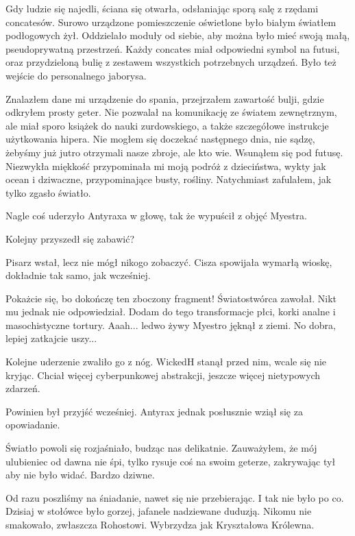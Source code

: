 Gdy ludzie się najedli, ściana się otwarła, odsłaniając sporą salę z rzędami concatesów.
Surowo urządzone pomieszczenie oświetlone było białym światłem podłogowych żył.
Oddzielało moduły od siebie, aby można było mieć swoją małą, pseudoprywatną przestrzeń.
Każdy concates miał odpowiedni symbol na futusi, oraz przydzieloną bulię z zestawem wszystkich potrzebnych urządzeń.
Było też wejście do personalnego jaborysa.

Znalazłem dane mi urządzenie do spania, przejrzałem zawartość bulji, gdzie odkryłem prosty geter.
Nie pozwalał na komunikację ze światem zewnętrznym, ale miał sporo książek do nauki zurdowskiego, a także szczegółowe instrukcje użytkowania hipera.
Nie mogłem się doczekać następnego dnia, nie sądzę, żebyśmy już jutro otrzymali nasze zbroje, ale kto wie.
Wsunąłem się pod futusę.
Niezwykła miękkość przypominała mi moją podróż z dzieciństwa, wykty jak ocean i dziwaczne, przypominające busty, rośliny.
Natychmiast zafulałem, jak tylko zgasło światło.

\divider{}

Nagle coś uderzyło Antyraxa w głowę, tak że wypuścił z objęć Myestra.

Kolejny przyszedł się zabawić?

Pisarz wstał, lecz nie mógł nikogo zobaczyć.
Cisza spowijała wymarłą wioskę, dokładnie tak samo, jak wcześniej.

\begin{dialogue}
\ds{} Pokażcie się, bo dokończę ten zboczony fragment! \dm{} Światostwórca zawołał. Nikt mu jednak nie odpowiedział. \dm{} Dodam do tego transformacje płci, korki analne i masochistyczne tortury.
\ds{} Aaah... \dm{} ledwo żywy Myestro jęknął z ziemi.
\ds{} No dobra, lepiej zatkajcie uszy...
\end{dialogue}

Kolejne uderzenie zwaliło go z nóg. 
WickedH stanął przed nim, wcale się nie kryjąc.
Chciał więcej cyberpunkowej abstrakcji, jeszcze więcej nietypowych zdarzeń.

Powinien był przyjść wcześniej.
Antyrax jednak posłusznie wziął się za opowiadanie.

\marker{}
\divider{}

Światło powoli się rozjaśniało, budząc nas delikatnie.
Zauważyłem, że mój ulubieniec od dawna nie śpi, tylko rysuje coś na swoim geterze, zakrywając tył aby nie było widać.
Bardzo dziwne.

Od razu poszliśmy na śniadanie, nawet się nie przebierając. I tak nie było po co.
Dzisiaj w stołówce było gorzej, jafanele nadziewane duduzją.
Nikomu nie smakowało, zwłaszcza Rohostowi. Wybrzydza jak Kryształowa Królewna.

